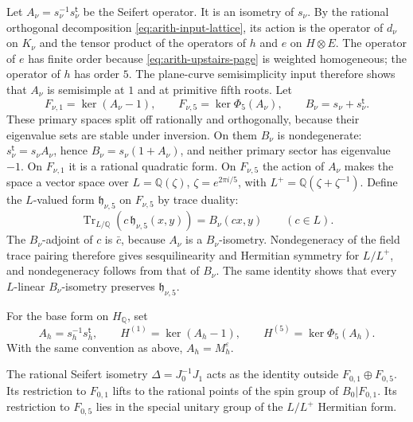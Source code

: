 Let $A_\nu=s_\nu^{-1}s_\nu^{\mathsf t}$ be the Seifert operator.
It is an isometry of $s_\nu$.  By the rational orthogonal decomposition
\eqref{eq:arith-input-lattice}, its action is the operator of $d_\nu$
on $K_\nu$ and the tensor product of the operators of $h$ and $e$
on $H\otimes E$.  The operator of $e$ has finite order because
\eqref{eq:arith-upstairs-page} is weighted homogeneous; the operator
of $h$ has order $5$.  The plane-curve semisimplicity input therefore
shows that $A_\nu$ is semisimple at $1$ and at primitive fifth roots.
Let
\[
 F_{\nu,1}=\ker(A_\nu-1),\qquad
 F_{\nu,5}=\ker\Phi_5(A_\nu),\qquad
 B_\nu=s_\nu+s_\nu^{\mathsf t}.
\]
These primary spaces split off rationally and orthogonally, because
their eigenvalue sets are stable under inversion.  On them $B_\nu$
is nondegenerate: $s_\nu^{\mathsf t}=s_\nu A_\nu$, hence
$B_\nu=s_\nu(1+A_\nu)$, and neither primary sector has eigenvalue
$-1$.  On $F_{\nu,1}$ it is a rational quadratic form.  On
$F_{\nu,5}$ the action of $A_\nu$ makes the space a vector space over
$L=\mathbb Q(\zeta)$, $\zeta=e^{2\pi i/5}$, with
$L^+=\mathbb Q(\zeta+\zeta^{-1})$. Define the $L$-valued form
$\mathfrak h_{\nu,5}$ on $F_{\nu,5}$ by trace duality:
\[
 \operatorname{Tr}_{L/\mathbb Q}\!\left(c\,\mathfrak h_{\nu,5}(x,y)\right)
   =B_\nu(cx,y)\qquad(c\in L).
\]
The $B_\nu$-adjoint of $c$ is $\bar c$, because $A_\nu$ is a
$B_\nu$-isometry. Nondegeneracy of the field trace pairing therefore
gives sesquilinearity and Hermitian symmetry for $L/L^+$, and
nondegeneracy follows from that of $B_\nu$. The same identity shows
that every $L$-linear $B_\nu$-isometry preserves $\mathfrak h_{\nu,5}$.

For the base form on $H_{\mathbb Q}$, set
\[
 A_h=s_h^{-1}s_h^{\mathsf t},\qquad
 H^{(1)}=\ker(A_h-1),\qquad H^{(5)}=\ker\Phi_5(A_h).
\]
With the same convention as above, $A_h=M_h^\varepsilon$.

\begin{lemma}\label{lem:arith-discrepancy}
The rational Seifert isometry
$\Delta=J_0^{-1}J_1$ acts as the identity outside
$F_{0,1}\oplus F_{0,5}$.  Its restriction to $F_{0,1}$ lifts to the
rational points of the spin group of $B_0|F_{0,1}$.  Its restriction to
$F_{0,5}$ lies in the special unitary group of the $L/L^+$ Hermitian
form.
\end{lemma}

